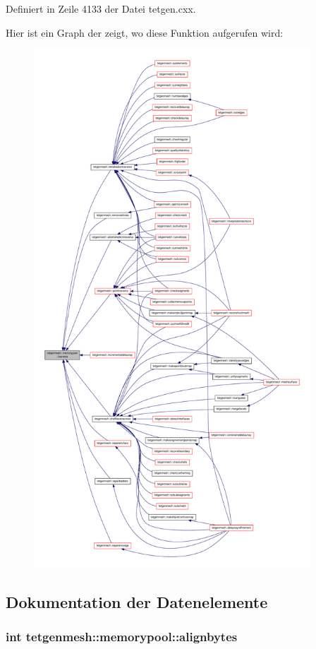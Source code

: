 Definiert in Zeile 4133 der Datei tetgen.\-cxx.



Hier ist ein Graph der zeigt, wo diese Funktion aufgerufen wird\-:\nopagebreak
\begin{figure}[H]
\begin{center}
\leavevmode
\includegraphics[height=550pt]{classtetgenmesh_1_1memorypool_a151fe73459d0fa9a7262d0030fecf291_icgraph}
\end{center}
\end{figure}




\subsection{Dokumentation der Datenelemente}
\hypertarget{classtetgenmesh_1_1memorypool_a83ede6da644205f50ae359dc633a92a5}{
\subsubsection[{alignbytes}]{\setlength{\rightskip}{0pt plus 5cm}int tetgenmesh\-::memorypool\-::alignbytes}}\label{classtetgenmesh_1_1memorypool_a83ede6da644205f50ae359dc633a92a5}


